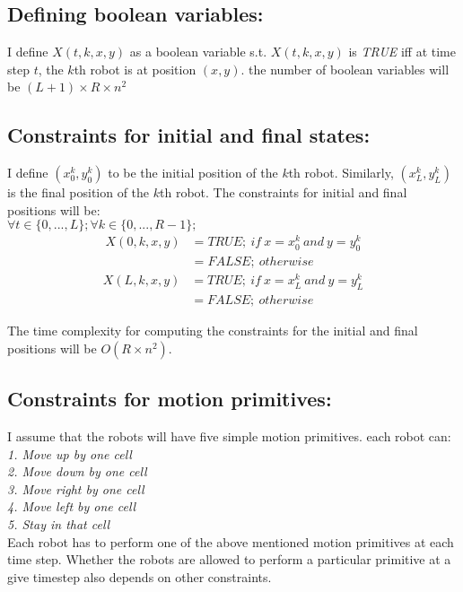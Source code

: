 \documentclass{article}[11pt]
\begin{document}
		\subsection{Defining boolean variables:}
			I define $X(t, k, x, y)$ as a boolean variable s.t. $X(t, k, x, y)$ is \textit{TRUE} iff at time step $t$, the $k$th robot is at position $(x,y)$. the number of boolean variables will be $(L+1) \times R \times n^2$
		
		\subsection{Constraints for initial and final states:}
			I define $(x_0^k,y_0^k)$ to be the initial position of the $k$th robot.
			Similarly, $(x_L^k, y_L^k)$ is the final position of the $k$th robot.
			The constraints for initial and final positions will be: \\
			$\forall{t \in \{0,...,L\}};\forall{k \in \{0,...,R-1\}};$
			\begin{equation*}
			\begin{split}
				X(0, k, x, y) &= TRUE;\ if \ x = x_0^k \ and \ y=y_0^k\\
				                                    &= FALSE;\ otherwise
			\end{split}
			\end{equation*}
			\begin{equation*}
			\begin{split}
				X(L, k, x, y) &= TRUE;\ if \ x = x_L^k \ and \ y=y_L^k \\
				                                    &= FALSE;\ otherwise
			\end{split}
			\end{equation*}

			The time complexity for computing the constraints for the initial and final positions will be $O(R \times n^2)$.			

		\subsection{Constraints for motion primitives:}
			I assume that the robots will have five simple motion primitives. each robot can:\\
			\textit{
				1. Move up by one cell\\
				2. Move down by one cell\\
				3. Move right by one cell\\
				4. Move left by one cell\\
				5. Stay in that cell\\ 
			}
			Each robot has to perform one of the above mentioned motion primitives at each time step. Whether the robots are allowed to perform a particular primitive at a give timestep also depends on other constraints.\\
\end{document}
